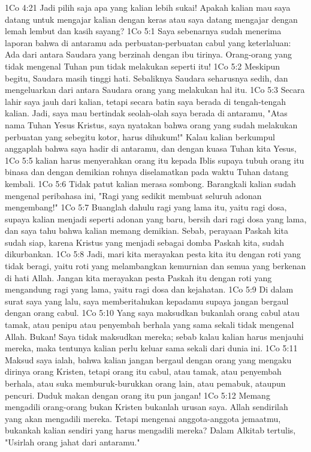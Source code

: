 1Co 4:21  Jadi pilih saja apa yang kalian lebih sukai! Apakah kalian mau saya datang untuk mengajar kalian dengan keras atau saya datang mengajar dengan lemah lembut dan kasih sayang?
1Co 5:1  Saya sebenarnya sudah menerima laporan bahwa di antaramu ada perbuatan-perbuatan cabul yang keterlaluan: Ada dari antara Saudara yang berzinah dengan ibu tirinya. Orang-orang yang tidak mengenal Tuhan pun tidak melakukan seperti itu!
1Co 5:2  Meskipun begitu, Saudara masih tinggi hati. Sebaliknya Saudara seharusnya sedih, dan mengeluarkan dari antara Saudara orang yang melakukan hal itu.
1Co 5:3  Secara lahir saya jauh dari kalian, tetapi secara batin saya berada di tengah-tengah kalian. Jadi, saya mau bertindak seolah-olah saya berada di antaramu, "Atas nama Tuhan Yesus Kristus, saya nyatakan bahwa orang yang sudah melakukan perbuatan yang sebegitu kotor, harus dihukum!" Kalau kalian berkumpul anggaplah bahwa saya hadir di antaramu, dan dengan kuasa Tuhan kita Yesus,
1Co 5:5  kalian harus menyerahkan orang itu kepada Iblis supaya tubuh orang itu binasa dan dengan demikian rohnya diselamatkan pada waktu Tuhan datang kembali.
1Co 5:6  Tidak patut kalian merasa sombong. Barangkali kalian sudah mengenal peribahasa ini, "Ragi yang sedikit membuat seluruh adonan mengembang!"
1Co 5:7  Buanglah dahulu ragi yang lama itu, yaitu ragi dosa, supaya kalian menjadi seperti adonan yang baru, bersih dari ragi dosa yang lama, dan saya tahu bahwa kalian memang demikian. Sebab, perayaan Paskah kita sudah siap, karena Kristus yang menjadi sebagai domba Paskah kita, sudah dikurbankan.
1Co 5:8  Jadi, mari kita merayakan pesta kita itu dengan roti yang tidak beragi, yaitu roti yang melambangkan kemurnian dan semua yang berkenan di hati Allah. Jangan kita merayakan pesta Paskah itu dengan roti yang mengandung ragi yang lama, yaitu ragi dosa dan kejahatan.
1Co 5:9  Di dalam surat saya yang lalu, saya memberitahukan kepadamu supaya jangan bergaul dengan orang cabul.
1Co 5:10  Yang saya maksudkan bukanlah orang cabul atau tamak, atau penipu atau penyembah berhala yang sama sekali tidak mengenal Allah. Bukan! Saya tidak maksudkan mereka; sebab kalau kalian harus menjauhi mereka, maka tentunya kalian perlu keluar sama sekali dari dunia ini.
1Co 5:11  Maksud saya ialah, bahwa kalian jangan bergaul dengan orang yang mengaku dirinya orang Kristen, tetapi orang itu cabul, atau tamak, atau penyembah berhala, atau suka memburuk-burukkan orang lain, atau pemabuk, ataupun pencuri. Duduk makan dengan orang itu pun jangan!
1Co 5:12  Memang mengadili orang-orang bukan Kristen bukanlah urusan saya. Allah sendirilah yang akan mengadili mereka. Tetapi mengenai anggota-anggota jemaatmu, bukankah kalian sendiri yang harus mengadili mereka? Dalam Alkitab tertulis, "Usirlah orang jahat dari antaramu."
